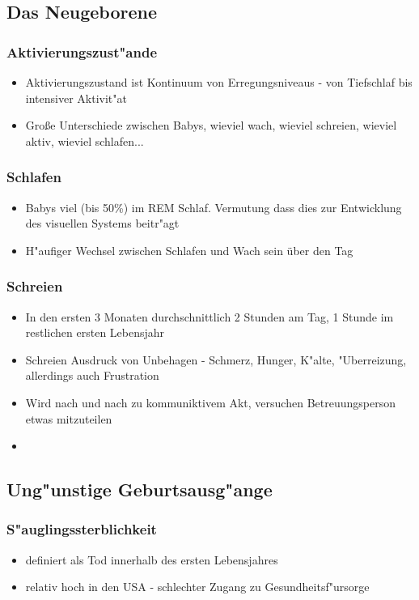 \subsection{Das Neugeborene}
\subsubsection{Aktivierungszust"ande}
\begin{itemize}
	\item
		Aktivierungszustand ist Kontinuum von Erregungsniveaus - von Tiefschlaf bis intensiver Aktivit"at
	\item
		Große Unterschiede zwischen Babys, wieviel wach, wieviel schreien, wieviel aktiv, wieviel schlafen...
\end{itemize}

\subsubsection{Schlafen}
\begin{itemize}
	\item
		Babys viel (bis 50\%) im REM Schlaf. Vermutung dass dies zur Entwicklung des visuellen Systems beitr"agt
	\item
		H"aufiger Wechsel zwischen Schlafen und Wach sein über den Tag
\end{itemize}
\subsubsection{Schreien}
\begin{itemize}
	\item
		In den ersten 3 Monaten durchschnittlich 2 Stunden am Tag, 1 Stunde im restlichen ersten Lebensjahr
	\item
		Schreien Ausdruck von Unbehagen - Schmerz, Hunger, K"alte, "Uberreizung, allerdings auch Frustration
	\item
		Wird nach und nach zu kommuniktivem Akt, versuchen Betreuungsperson etwas mitzuteilen
	\item

\end{itemize}


\subsection{Ung"unstige Geburtsausg"ange}
\subsubsection{S"auglingssterblichkeit}
\begin{itemize}
	\item
		definiert als Tod innerhalb des ersten Lebensjahres
	\item
		relativ hoch in den USA - schlechter Zugang zu Gesundheitsf"ursorge
\end{itemize}

